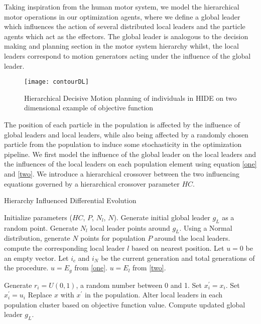 Taking inspiration from the human motor system, we model the hierarchical motor operations in our optimization agents, where we define a global leader which influences the action of several distributed local leaders and the particle agents which act as the effectors. The global leader is analogous to the decision making and planning section in the motor system hierarchy whilst, the local leaders correspond to motion generators acting under the influence of the  global leader.

\begin{figure}[h!]
  \texttt{[image: contourDL]}
  \caption{Hierarchical Decisive Motion planning of individuals in HIDE on two dimensional example of objective function}
  \label{fig:contourDL}
\end{figure}

The position of each particle in the population is affected by the influence of global leaders and local leaders, while also being affected by a randomly chosen particle from the population to induce some stochasticity in the optimization pipeline. We first model the influence of the global leader on the local leaders and the influences of the local leaders  on each population element using equation \eqref{one} and \eqref{two}. We introduce a hierarchical crossover between the two influencing equations governed by a hierarchical crossover parameter $HC$.

\begin{algorithm}
\caption{Hierarchy Influenced Differential Evolution}
\label{algo}
\begin{algorithmic}[1]
    \State Initialize parameters ($HC$, $P$, $N_l$, $N$).
    \State Generate initial global leader $g_L$ as a random point.
    \State Generate $N_l$ local leader points around $g_L$.
    \State Using a Normal distribution, generate $N$ points for population $P$ around the local leaders.
        \State compute the corresponding local leader $l$ based on nearest position.
        \State Let $u = 0$ be an empty vector.
        \State Let $i_c$ and $i_N$ be the current generation and total generations of the procedure.
          \State $u = E_g$ from \eqref{one}.
        \Else
          \State $u = E_l$ from \eqref{two}.
        \EndIf
        
          \State Generate $r_i = U(0, 1)$, a random number between 0 and 1.
            \State Set $x_i^{'} = x_i$.
          \Else
            \State Set $x_i^{'} = u_i$
          \EndIf
        \EndFor
          \State Replace $x$ with $x^{'}$ in the population.
        \EndIf
      \EndFor
      \State Alter local leaders in each population cluster based on objective function value.
      \State Compute updated global leader $g_L$.
    \EndWhile
  \EndProcedure
\end{algorithmic}
\end{algorithm}

